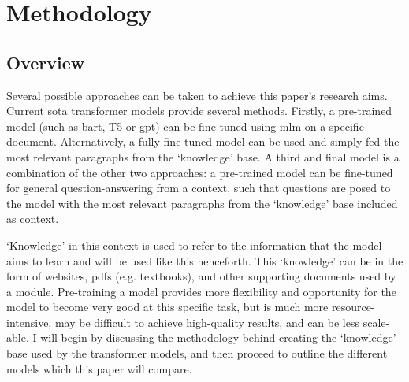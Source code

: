 \chapter{Methodology}\label{ch:methodology}

\section{Overview}
Several possible approaches can be taken to achieve this paper's research aims. Current \acrshort{sota} transformer models provide several methods. Firstly, a pre-trained model (such as \acrshort{bart}, T5 or \acrshort{gpt}) can be fine-tuned using \acrfull{mlm} on a specific document. Alternatively, a fully fine-tuned model can be used and simply fed the most relevant paragraphs from the `knowledge' base. A third and final model is a combination of the other two approaches: a pre-trained model can be fine-tuned for general question-answering from a context, such that questions are posed to the model with the most relevant paragraphs from the `knowledge' base included as context.

`Knowledge' in this context is used to refer to the information that the model aims to learn and will be used like this henceforth. This `knowledge' can be in the form of websites, \acrshort{pdf}s (e.g. textbooks), and other supporting documents used by a module. Pre-training a model provides more flexibility and opportunity for the model to become very good at this specific task, but is much more resource-intensive, may be difficult to achieve high-quality results, and can be less scale-able. I will begin by discussing the methodology behind creating the `knowledge' base used by the transformer models, and then proceed to outline the different models which this paper will compare.


